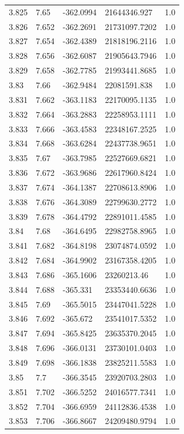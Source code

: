 \begin{tabular}{lllll}
3.825 & 7.65 & -362.0994 & 21644346.927 & 1.0 \\
3.826 & 7.652 & -362.2691 & 21731097.7202 & 1.0 \\
3.827 & 7.654 & -362.4389 & 21818196.2116 & 1.0 \\
3.828 & 7.656 & -362.6087 & 21905643.7946 & 1.0 \\
3.829 & 7.658 & -362.7785 & 21993441.8685 & 1.0 \\
3.83 & 7.66 & -362.9484 & 22081591.838 & 1.0 \\
3.831 & 7.662 & -363.1183 & 22170095.1135 & 1.0 \\
3.832 & 7.664 & -363.2883 & 22258953.1111 & 1.0 \\
3.833 & 7.666 & -363.4583 & 22348167.2525 & 1.0 \\
3.834 & 7.668 & -363.6284 & 22437738.9651 & 1.0 \\
3.835 & 7.67 & -363.7985 & 22527669.6821 & 1.0 \\
3.836 & 7.672 & -363.9686 & 22617960.8424 & 1.0 \\
3.837 & 7.674 & -364.1387 & 22708613.8906 & 1.0 \\
3.838 & 7.676 & -364.3089 & 22799630.2772 & 1.0 \\
3.839 & 7.678 & -364.4792 & 22891011.4585 & 1.0 \\
3.84 & 7.68 & -364.6495 & 22982758.8965 & 1.0 \\
3.841 & 7.682 & -364.8198 & 23074874.0592 & 1.0 \\
3.842 & 7.684 & -364.9902 & 23167358.4205 & 1.0 \\
3.843 & 7.686 & -365.1606 & 23260213.46 & 1.0 \\
3.844 & 7.688 & -365.331 & 23353440.6636 & 1.0 \\
3.845 & 7.69 & -365.5015 & 23447041.5228 & 1.0 \\
3.846 & 7.692 & -365.672 & 23541017.5352 & 1.0 \\
3.847 & 7.694 & -365.8425 & 23635370.2045 & 1.0 \\
3.848 & 7.696 & -366.0131 & 23730101.0403 & 1.0 \\
3.849 & 7.698 & -366.1838 & 23825211.5583 & 1.0 \\
3.85 & 7.7 & -366.3545 & 23920703.2803 & 1.0 \\
3.851 & 7.702 & -366.5252 & 24016577.7341 & 1.0 \\
3.852 & 7.704 & -366.6959 & 24112836.4538 & 1.0 \\
3.853 & 7.706 & -366.8667 & 24209480.9794 & 1.0 \\

\end{tabular}
